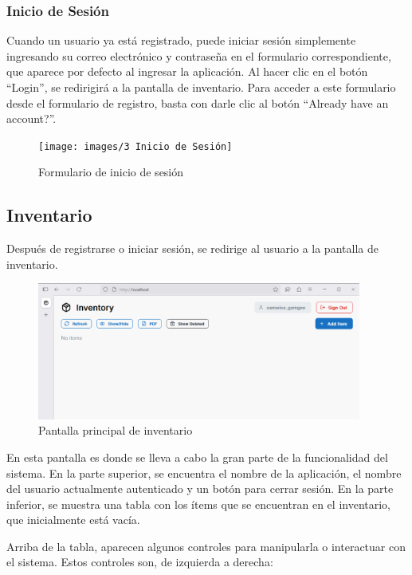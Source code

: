 \subsubsection{Inicio de Sesión}

Cuando un usuario ya está registrado, puede iniciar sesión simplemente ingresando su correo electrónico y contraseña en el formulario correspondiente, que aparece por defecto al ingresar la aplicación. Al hacer clic en el botón “Login”, se redirigirá a la pantalla de inventario. Para acceder a este formulario desde el formulario de registro, basta con darle clic al botón “Already have an account?”.

\begin{figure}[H]
    \centering
    \texttt{[image: images/3 Inicio de Sesión]}
    \caption{Formulario de inicio de sesión}
\end{figure}

\subsection{Inventario}

Después de registrarse o iniciar sesión, se redirige al usuario a la pantalla de inventario.

\begin{figure}[H]
    \centering
    \includegraphics[width=0.95\textwidth]{images/4 Inventario}
    \caption{Pantalla principal de inventario}
\end{figure}

En esta pantalla es donde se lleva a cabo la gran parte de la funcionalidad del sistema. En la parte superior, se encuentra el nombre de la aplicación, el nombre del usuario actualmente autenticado y un botón para cerrar sesión. En la parte inferior, se muestra una tabla con los ítems que se encuentran en el inventario, que inicialmente está vacía.

Arriba de la tabla, aparecen algunos controles para manipularla o interactuar con el sistema. Estos controles son, de izquierda a derecha:

